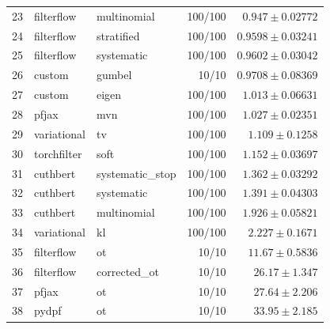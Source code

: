 \begin{table}[!htbp]
\begin{tabular}{rllrr}
23 & filterflow & multinomial & 100/100 & $0.947 \pm 0.02772$ \\
24 & filterflow & stratified & 100/100 & $0.9598 \pm 0.03241$ \\
25 & filterflow & systematic & 100/100 & $0.9602 \pm 0.03042$ \\
26 & custom & gumbel & 10/10 & $0.9708 \pm 0.08369$ \\
27 & custom & eigen & 100/100 & $1.013 \pm 0.06631$ \\
28 & pfjax & mvn & 100/100 & $1.027 \pm 0.02351$ \\
29 & variational & tv & 100/100 & $1.109 \pm 0.1258$ \\
30 & torchfilter & soft & 100/100 & $1.152 \pm 0.03697$ \\
31 & cuthbert & systematic\_stop & 100/100 & $1.362 \pm 0.03292$ \\
32 & cuthbert & systematic & 100/100 & $1.391 \pm 0.04303$ \\
33 & cuthbert & multinomial & 100/100 & $1.926 \pm 0.05821$ \\
34 & variational & kl & 100/100 & $2.227 \pm 0.1671$ \\
35 & filterflow & ot & 10/10 & $11.67 \pm 0.5836$ \\
36 & filterflow & corrected\_ot & 10/10 & $26.17 \pm 1.347$ \\
37 & pfjax & ot & 10/10 & $27.64 \pm 2.206$ \\
38 & pydpf & ot & 10/10 & $33.95 \pm 2.185$ \\
\bottomrule
\end{tabular}
\end{table}


